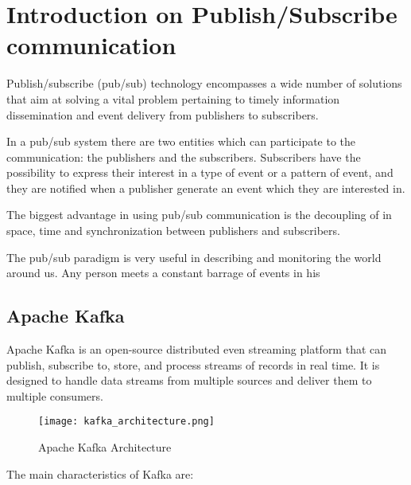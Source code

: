 

\chapter{Introduction on Publish/Subscribe communication}

Publish/subscribe (pub/sub) technology encompasses a wide number of solutions
that aim at solving a vital problem pertaining to timely information
dissemination and event delivery from publishers to subscribers.
\cite{Pub/Sub_pattern}

In a pub/sub system there are two entities which can participate to the
communication: the publishers and the subscribers.
Subscribers have the possibility to express their interest in a type of event
or a pattern of event, and they are notified when a publisher generate an event
which they are interested in.

The biggest advantage in using pub/sub communication is the decoupling of
in space, time and synchronization between publishers and subscribers.
\cite{Many_faces_of_pub/sub}

The pub/sub paradigm is very useful in describing and monitoring the world
around us. Any person meets a constant barrage of events in his 


\section{Apache Kafka}

Apache Kafka is an open-source distributed even streaming platform that can
publish, subscribe to, store, and process streams of records in real time.
It is designed to handle data streams from multiple sources and deliver them to
multiple consumers. \cite{garg2013apache}

\begin{figure}[ht]
    \centering
    \texttt{[image: kafka\_architecture.png]}
    \caption{Apache Kafka Architecture}
\end{figure}

The main characteristics of Kafka are:

